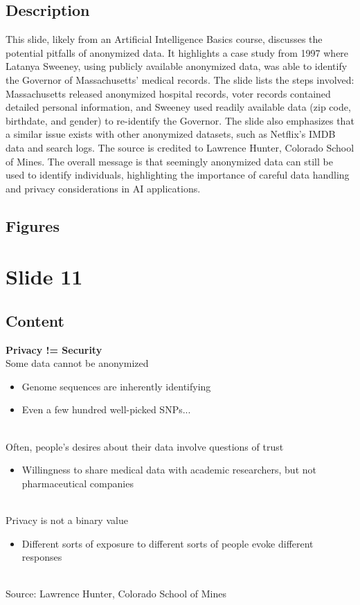 \documentclass{article}%
\begin{document}
\subsection{Description}%
This slide, likely from an Artificial Intelligence Basics course, discusses the potential pitfalls of anonymized data.  It highlights a case study from 1997 where Latanya Sweeney, using publicly available anonymized data, was able to identify the Governor of Massachusetts' medical records.  The slide lists the steps involved: Massachusetts released anonymized hospital records, voter records contained detailed personal information, and Sweeney used readily available data (zip code, birthdate, and gender) to re-identify the Governor.  The slide also emphasizes that a similar issue exists with other anonymized datasets, such as Netflix's IMDB data and search logs.  The source is credited to Lawrence Hunter, Colorado School of Mines.  The overall message is that seemingly anonymized data can still be used to identify individuals, highlighting the importance of careful data handling and privacy considerations in AI applications.%
\subsection{Figures}%
\begin{figure}[H]%
\centering%
\end{figure}

%
\newpage%
\section{Slide 11}%
\label{sec:Slide11}%
\subsection{Content}%

\textbf{Privacy != Security} \\
Some data cannot be anonymized \\
\begin{itemize}
    \item Genome sequences are inherently identifying
    \item Even a few hundred well-picked SNPs...
\end{itemize} \\
Often, people's desires about their data involve questions of trust \\
\begin{itemize}
    \item Willingness to share medical data with academic researchers, but not pharmaceutical companies
\end{itemize} \\
Privacy is not a binary value \\
\begin{itemize}
    \item Different sorts of exposure to different sorts of people evoke different responses
\end{itemize} \\
Source: Lawrence Hunter, Colorado School of Mines
%
\end{document}
